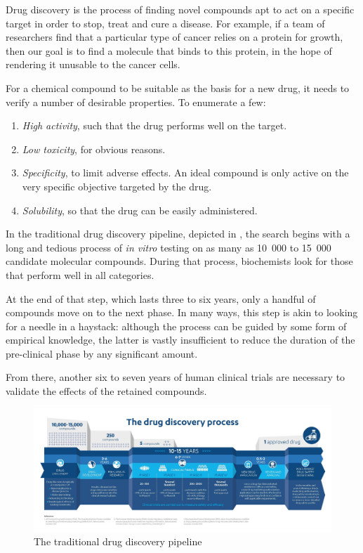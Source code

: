 \documentclass[11pt]{article}
\numberwithin{equation}{subsection}
\begin{document}
Drug discovery is the process of finding novel compounds apt to act on a specific target in order to stop, treat and cure a disease. For example, if a team of researchers find that a particular type of cancer relies on a protein for growth, then our goal is to find a molecule that binds to this protein, in the hope of rendering it unusable to the cancer cells.

For a chemical compound to be suitable as the basis for a new drug, it needs to verify a number of desirable properties. To enumerate a few:
\begin{enumerate}
  \item \textit{High activity}, such that the drug performs well on the target.
  \item \textit{Low toxicity}, for obvious reasons.
  \item \textit{Specificity}, to limit adverse effects. An ideal compound is only active on the very specific objective targeted by the drug.
  \item \textit{Solubility}, so that the drug can be easily administered.
\end{enumerate}

In the traditional drug discovery pipeline, depicted in , the search begins with a long and tedious process of \textit{in vitro} testing on as many as 10~000 to 15~000 candidate molecular compounds. During that process, biochemists look for those that perform well in all categories.

At the end of that step, which lasts three to six years, only a handful of compounds move on to the next phase. In many ways, this step is akin to looking for a needle in a haystack: although the process can be guided by some form of empirical knowledge, the latter is vastly insufficient to reduce the duration of the pre-clinical phase by any significant amount.

From there, another six to seven years of human clinical trials are necessary to validate the effects of the retained compounds.


\begin{figure}[ht]
  \includegraphics[width=1.3\textwidth,center]{drug-discovery}
  \caption{The traditional drug discovery pipeline \citep{janssen2019}}
  \label{fig:drug-discovery}
\end{figure}
\end{document}
